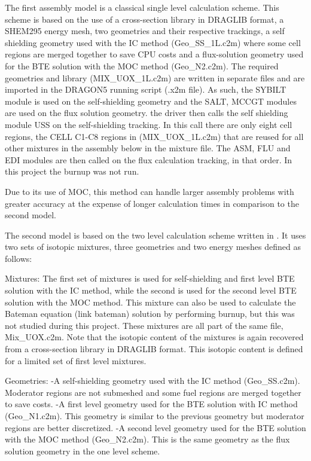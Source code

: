 \documentclass[12pt]{article}
\begin{document}
The first assembly model is a classical single level calculation scheme. This scheme is based on the use of a cross-section library in DRAGLIB format, a SHEM295 energy mesh, two geometries and their respective trackings, a self shielding geometry used with the IC method (Geo\_SS\_1L.c2m) where some cell regions are merged together to save CPU costs and a flux-solution geometry used for the BTE solution with the MOC method (Geo\_N2.c2m). The required geometries and library (MIX\_UOX\_1L.c2m) are written in separate files and are imported in the DRAGON5 running script (.x2m file). As such, the SYBILT module is used on the self-shielding geometry and the SALT, MCCGT modules are used on the flux solution geometry. the driver then calls the self shielding module USS on the self-shielding tracking. In this call there are only eight cell regions, the CELL C1-C8 regions in (MIX\_UOX\_1L.c2m) that are reused for all other mixtures in the assembly below in the mixture file. The ASM, FLU and EDI modules are then called on the flux calculation tracking, in that order. In this project the burnup was not run.

Due to its use of MOC, this method can handle larger assembly problems with greater accuracy at the expense of longer calculation times in comparison to the second model.

The second model is based on the two level calculation scheme written in \cite{canbakan2015accuracy}. It uses two sets of isotopic mixtures, three geometries and two energy meshes defined as follows:

Mixtures:
The first set of mixtures is used for self-shielding and first level BTE solution with the IC method, while the second is used for the second level BTE solution with the MOC method. This mixture can also be used to calculate the Bateman equation (link bateman) solution by performing burnup, but this was not studied during this project. These mixtures are all part of the same file, Mix\_UOX.c2m. Note that the isotopic content of the mixtures is again recovered from a cross-section library in DRAGLIB format. This isotopic content is defined for a limited set of first level mixtures.

Geometries:
-A self-shielding geometry used with the IC method (Geo\_SS.c2m). Moderator regions are not submeshed and some fuel regions are merged together to save costs.
-A first level geometry used for the BTE solution with IC method (Geo\_N1.c2m). This geometry is similar to the previous geometry but moderator regions are better discretized.
-A second level geometry used for the BTE solution with the MOC method (Geo\_N2.c2m). This is the same geometry as the flux solution geometry in the one level scheme. 
\end{document}
